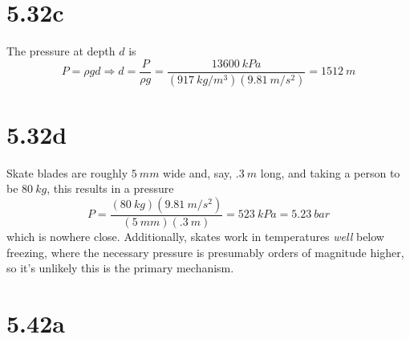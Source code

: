 \documentclass{article}
\begin{document}
\section*{5.32c}
The pressure at depth $d$ is
\[P=\rho g d\Rightarrow d=\frac{P}{\rho g}=\frac{\SI{13600}{kPa}}{(\SI{917}{kg/m^{3}})(\SI{9.81}{m/s^{2}})}=\SI{1512}{m}\]

\section*{5.32d}
Skate blades are roughly $\SI{5}{mm}$ wide and, say, $\SI{.3}{m}$ long, and taking a person to be $\SI{80}{kg}$, this results in a pressure
\[P=\frac{(\SI{80}{kg})(\SI{9.81}{m/s^{2}})}{(\SI{5}{mm})(\SI{.3}{m})}=\SI{523}{kPa}=\SI{5.23}{bar}\]
which is nowhere close. Additionally, skates work in temperatures \textit{well} below freezing, where the necessary pressure is presumably orders of magnitude higher, so it's unlikely this is the primary mechanism.

\section*{5.42a}
\end{document}
